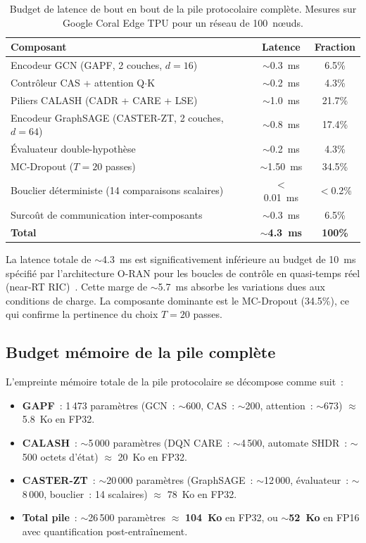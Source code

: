 \begin{table}[htbp]
\centering
\caption{Budget de latence de bout en bout de la pile protocolaire complète. Mesures sur Google Coral Edge TPU pour un réseau de 100~n\oe{}uds.}
\label{tab:latency-budget}
\begin{tabular}{lcc}
\toprule
\textbf{Composant} & \textbf{Latence} & \textbf{Fraction} \\
\midrule
Encodeur GCN (GAPF, 2 couches, $d=16$) & $\sim$0.3~ms & 6.5\% \\
Contrôleur CAS + attention Q$\cdot$K & $\sim$0.2~ms & 4.3\% \\
Piliers CALASH (CADR + CARE + LSE) & $\sim$1.0~ms & 21.7\% \\
Encodeur GraphSAGE (CASTER-ZT, 2 couches, $d=64$) & $\sim$0.8~ms & 17.4\% \\
Évaluateur double-hypothèse & $\sim$0.2~ms & 4.3\% \\
MC-Dropout ($T=20$ passes) & $\sim$1.50~ms & 34.5\% \\
Bouclier déterministe (14 comparaisons scalaires) & $<$0.01~ms & $<$0.2\% \\
Surcoût de communication inter-composants & $\sim$0.3~ms & 6.5\% \\
\midrule
\textbf{Total} & $\sim$\textbf{4.3~ms} & \textbf{100\%} \\
\bottomrule
\end{tabular}
\end{table}

\noindent La latence totale de $\sim$4.3~ms est significativement inférieure au budget de 10~ms spécifié par l'architecture O-RAN pour les boucles de contrôle en quasi-temps réel (near-RT RIC)~\cite{polese2023oran}. Cette marge de $\sim$5.7~ms absorbe les variations dues aux conditions de charge. La composante dominante est le MC-Dropout (34.5\%), ce qui confirme la pertinence du choix $T = 20$ passes.

\subsection{Budget mémoire de la pile complète}

L'empreinte mémoire totale de la pile protocolaire se décompose comme suit~:

\begin{itemize}
    \item \textbf{GAPF}~: 1\,473 paramètres (GCN~: $\sim$600, CAS~: $\sim$200, attention~: $\sim$673) $\approx$ 5.8~Ko en FP32.
    \item \textbf{CALASH}~: $\sim$5\,000 paramètres (DQN CARE~: $\sim$4\,500, automate SHDR~: $\sim$500 octets d'état) $\approx$ 20~Ko en FP32.
    \item \textbf{CASTER-ZT}~: $\sim$20\,000 paramètres (GraphSAGE~: $\sim$12\,000, évaluateur~: $\sim$8\,000, bouclier~: 14 scalaires) $\approx$ 78~Ko en FP32.
    \item \textbf{Total pile}~: $\sim$26\,500 paramètres $\approx$ \textbf{104~Ko} en FP32, ou $\sim$\textbf{52~Ko} en FP16 avec quantification post-entraînement.
\end{itemize}

